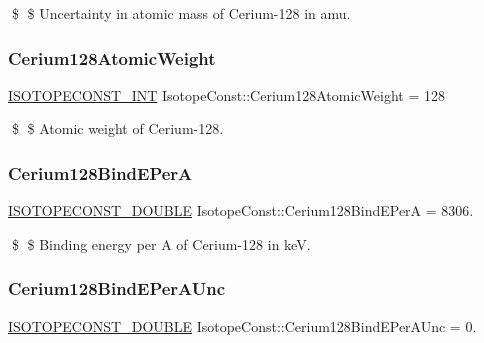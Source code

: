 \$ \$ Uncertainty in atomic mass of Cerium-\/128 in amu. \mbox{\label{group___isotope_const-_cerium-_ce128_ga3515c28111ff5c08f99e6a723868fe99}} 
\subsubsection{\texorpdfstring{Cerium128\+Atomic\+Weight}{Cerium128AtomicWeight}}
{\footnotesize\ttfamily \mbox{\hyperlink{group___isotope_const-_macros_ga5f18360b3e99483a35c32d789e62621c}{I\+S\+O\+T\+O\+P\+E\+C\+O\+N\+S\+T\+\_\+\+I\+NT}} Isotope\+Const\+::\+Cerium128\+Atomic\+Weight = 128}

\$ \$ Atomic weight of Cerium-\/128. \mbox{\label{group___isotope_const-_cerium-_ce128_gab31a071e0921bcecf4c0958a76bd11d5}} 
\subsubsection{\texorpdfstring{Cerium128\+Bind\+E\+PerA}{Cerium128BindEPerA}}
{\footnotesize\ttfamily \mbox{\hyperlink{group___isotope_const-_macros_ga8f45a7272ce02c0b4c65c44636ed719a}{I\+S\+O\+T\+O\+P\+E\+C\+O\+N\+S\+T\+\_\+\+D\+O\+U\+B\+LE}} Isotope\+Const\+::\+Cerium128\+Bind\+E\+PerA = 8306.}

\$ \$ Binding energy per A of Cerium-\/128 in keV. \mbox{\label{group___isotope_const-_cerium-_ce128_gae3ad55e8dd8b1f38f93ac9d35d3fc998}} 
\subsubsection{\texorpdfstring{Cerium128\+Bind\+E\+Per\+A\+Unc}{Cerium128BindEPerAUnc}}
{\footnotesize\ttfamily \mbox{\hyperlink{group___isotope_const-_macros_ga8f45a7272ce02c0b4c65c44636ed719a}{I\+S\+O\+T\+O\+P\+E\+C\+O\+N\+S\+T\+\_\+\+D\+O\+U\+B\+LE}} Isotope\+Const\+::\+Cerium128\+Bind\+E\+Per\+A\+Unc = 0.}

